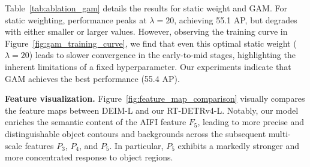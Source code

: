 Table~\ref{tab:ablation_gam} details the results for static weight and GAM. For static weighting, performance peaks at $\lambda=20$, achieving 55.1 AP, but degrades with either smaller or larger values. However, observing the training curve in Figure~\ref{fig:gam_training_curve}, we find that even this optimal static weight ($\lambda=20$) leads to slower convergence in the early-to-mid stages, highlighting the inherent limitations of a fixed hyperparameter. Our experiments indicate that GAM achieves the best performance (55.4 AP).

\noindent \textbf{Feature visualization.}
Figure~\ref{fig:feature_map_comparison} visually compares the feature maps between DEIM-L and our RT-DETRv4-L. Notably, our model enriches the semantic content of the AIFI feature $F_5$, leading to more precise and distinguishable object contours and backgrounds across the subsequent multi-scale features $P_3$, $P_4$, and $P_5$. In particular, $P_5$ exhibits a markedly stronger and more concentrated response to object regions.
